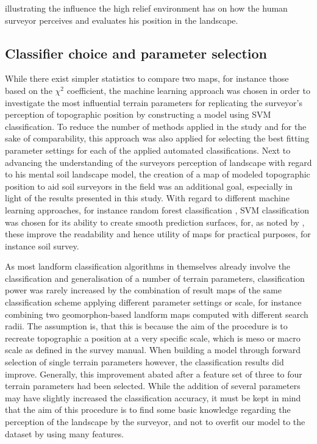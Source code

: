 \documentclass[preprint,12pt,authoryear]{elsarticle}
\begin{document}
illustrating the influence the high relief environment has on how the human surveyor perceives and evaluates his position in the landscape. 

\subsection{Classifier choice and parameter selection}
While there exist simpler statistics to compare two maps, for instance those based on the $\chi^2$ coefficient, the machine learning approach was chosen in order to investigate the most influential terrain parameters for replicating the surveyor's perception of topographic position by constructing a model using  SVM classification. To reduce the number of methods applied in the study and for the sake of comparability, this approach was also applied for selecting the best fitting parameter settings for each of the applied automated classifications. Next to advancing the understanding of the surveyors perception of landscape with regard to his mental soil landscape model, the creation of a map of modeled topographic position to aid soil surveyors in the field was an additional goal, especially in light of the results presented in this study. With regard to different machine learning approaches, for instance random forest classification \citep{Breiman2001}, SVM classification was chosen for its ability to create smooth prediction surfaces, for, as noted by \cite{Steger2016}, these improve the readability and hence utility of maps for practical purposes, for instance soil survey.

As most landform classification algorithms in themselves already involve the classification and generalisation of a number of terrain parameters, classification power was rarely increased by the combination of result maps of the same classification scheme applying different parameter settings or scale, for instance combining two geomorphon-based landform maps computed with different search radii. The assumption is, that this is because the aim of the procedure is to recreate topographic a position at a very specific scale, which is meso or macro scale as defined in the survey manual. When building a model through forward selection of single terrain parameters however, the classification results did improve. Generally, this improvement abated after a feature set of  three to four terrain parameters had been selected. While the addition of several parameters may have slightly increased the classification accuracy, it must be kept in mind that the aim of this procedure is to find some basic knowledge regarding the perception of the landscape by the surveyor, and not to overfit our model to the dataset by using many features.
\end{document}
